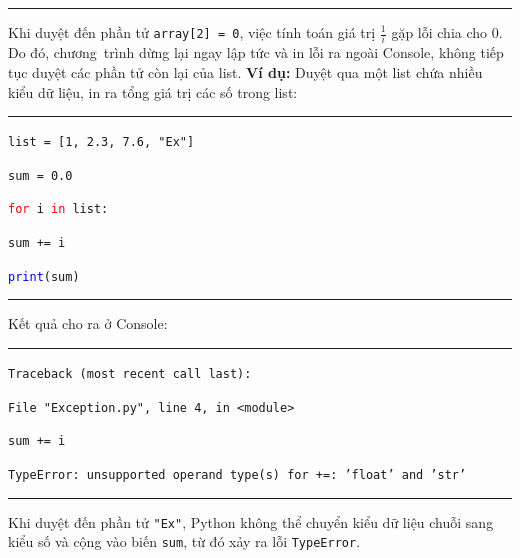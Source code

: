 \rule{\linewidth}{0.2mm}\par
\resetlinenumber
Khi duyệt đến phần tử \texttt{array[2] = 0}, việc tính toán giá trị $\frac{1}{i}$ gặp lỗi chia cho 0. Do đó, chương~trình dừng lại ngay lập tức và in lỗi ra ngoài Console, không tiếp tục duyệt các phần tử còn lại của list.
\newpage
\textbf{Ví dụ:} Duyệt qua một list chứa nhiều kiểu dữ liệu, in ra tổng giá trị các số trong list:\\
\rule{\linewidth}{0.2mm}\par
\begin{linenumbers}
	\texttt{list = [1, 2.3, 7.6, "Ex"]}\par
	\texttt{sum = 0.0}\par
	\texttt{\textcolor{red}{for} i \textcolor{red}{in} list:}\par
	\qquad\texttt{sum += i}\par
	\texttt{\textcolor{blue}{print}(sum)}\par
\end{linenumbers}
\rule{\linewidth}{0.2mm}\par
\noindent
\resetlinenumber
Kết quả cho ra ở Console:\\
\rule{\linewidth}{0.2mm}\par
\begin{linenumbers}
	\texttt{Traceback (most recent call last):}\par
	\texttt{File "Exception.py", line 4, in <module>}\par
	\qquad\texttt{sum += i}\par
	\texttt{TypeError: unsupported operand type(s) for +=: 'float' and 'str'}
\end{linenumbers}
\rule{\linewidth}{0.2mm}\par
Khi duyệt đến phần tử \texttt{"Ex"}, Python không thể chuyển kiểu dữ liệu chuỗi sang kiểu số và cộng vào biến \texttt{sum}, từ đó xảy ra lỗi \texttt{TypeError}.
\resetlinenumber
\newpage
